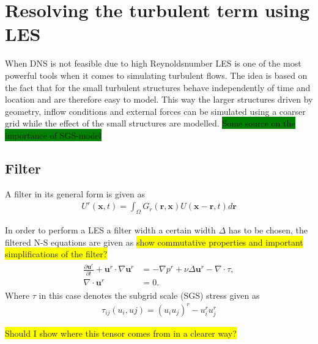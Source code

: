 \section{Resolving the turbulent term using LES}
When DNS is not feasible due to high Reynoldsnumber LES is one of the most powerful tools when it comes to simulating turbulent flows.
The idea is based on the fact that for the small turbulent structures behave independently of time and location and are therefore 
easy to model. This way the larger structures driven by geometry, inflow conditions and external forces can be simulated using a coarser 
grid while the effect of the small structures are modelled. \colorbox{green}{Some source on the importance of SGS-model}

\subsection{Filter}
A filter in its general form is given as 
\begin{align}
    U^r(\mathbf{x},t) = \int_{\Omega} G_r(\mathbf{r},\mathbf{x})U(\mathbf{x}-\mathbf{r},t)d\mathbf{r}
    \label{eq:filter}
\end{align}

In order to perform a LES a filter width a certain width $\Delta$ has to be chosen, 
the filtered N-S equations are given as 
\colorbox{yellow}{show commutative properties and important simplifications of the filter?}
%
\begin{align}
    \begin{split}
        \frac{\partial \mathbf{u}^r}{\partial t} + \mathbf{u}^r\cdot \nabla\mathbf{u}^r
        &= -\nabla p^r +\nu\Delta \mathbf{u}^r-\nabla \cdot \tau, \\
        \nabla \cdot \mathbf{u}^r &= 0.
    \end{split}
	\label{eq:NSfiltered}
\end{align}
%
Where $\tau$ in this case denotes the subgrid scale (SGS) stress given as 
\begin{align}
    \tau_{ij}(u_i,uj) = (u_iu_j)^r -u_i^ru_j^r
    \label{eq:sgstensor}
\end{align}

\colorbox{yellow}{Should I show where this tensor comes from in a clearer way?}

